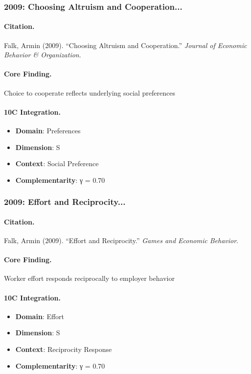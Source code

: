 \subsubsection{2009: Choosing Altruism and Cooperation...}

\paragraph{Citation.}
Falk, Armin (2009). ``Choosing Altruism and Cooperation.''
\textit{Journal of Economic Behavior & Organization}.

\paragraph{Core Finding.}
Choice to cooperate reflects underlying social preferences

\paragraph{10C Integration.}
\begin{itemize}[nosep]
  \item \textbf{Domain}: Preferences
  \item \textbf{Dimension}: S
  \item \textbf{Context}: Social Preference
  \item \textbf{Complementarity}: γ = 0.70
\end{itemize}


\subsubsection{2009: Effort and Reciprocity...}

\paragraph{Citation.}
Falk, Armin (2009). ``Effort and Reciprocity.''
\textit{Games and Economic Behavior}.

\paragraph{Core Finding.}
Worker effort responds reciprocally to employer behavior

\paragraph{10C Integration.}
\begin{itemize}[nosep]
  \item \textbf{Domain}: Effort
  \item \textbf{Dimension}: S
  \item \textbf{Context}: Reciprocity Response
  \item \textbf{Complementarity}: γ = 0.70
\end{itemize}



